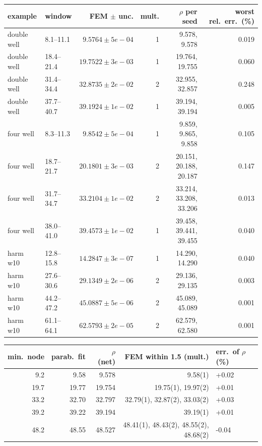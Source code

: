 \begin{tabular}{llrrrr}
\toprule
example & window & FEM $\pm$ unc. & mult. & $\rho$ per seed & worst rel.\ err.\ (\%) \\
\midrule
double well & 8.1--11.1 & $9.5764\pm5e-04$ & 1 & 9.578, 9.578 & 0.019 \\
double well & 18.4--21.4 & $19.7522\pm3e-03$ & 1 & 19.764, 19.755 & 0.060 \\
double well & 31.4--34.4 & $32.8735\pm2e-02$ & 2 & 32.955, 32.857 & 0.248 \\
double well & 37.7--40.7 & $39.1924\pm1e-02$ & 1 & 39.194, 39.194 & 0.005 \\
four well & 8.3--11.3 & $9.8542\pm5e-04$ & 1 & 9.859, 9.865, 9.858 & 0.105 \\
four well & 18.7--21.7 & $20.1801\pm3e-03$ & 2 & 20.151, 20.188, 20.187 & 0.147 \\
four well & 31.7--34.7 & $33.2104\pm1e-02$ & 2 & 33.214, 33.208, 33.206 & 0.013 \\
four well & 38.0--41.0 & $39.4573\pm1e-02$ & 1 & 39.458, 39.441, 39.455 & 0.040 \\
harm w10 & 12.8--15.8 & $14.2847\pm3e-07$ & 1 & 14.290, 14.290 & 0.040 \\
harm w10 & 27.6--30.6 & $29.1349\pm2e-06$ & 2 & 29.136, 29.135 & 0.003 \\
harm w10 & 44.2--47.2 & $45.0887\pm5e-06$ & 2 & 45.089, 45.089 & 0.001 \\
harm w10 & 61.1--64.1 & $62.5793\pm2e-05$ & 2 & 62.579, 62.580 & 0.001 \\
\bottomrule
\end{tabular}

\begin{tabular}{rrrrl}
\toprule
min.\ node & parab.\ fit & $\rho$ (net) & FEM within 1.5 (mult.) & err.\ of $\rho$ (\%) \\
\midrule
9.2 & 9.58 & 9.578 & 9.58(1) & +0.02 \\
19.7 & 19.77 & 19.754 & 19.75(1), 19.97(2) & +0.01 \\
33.2 & 32.70 & 32.797 & 32.79(1), 32.87(2), 33.03(2) & +0.03 \\
39.2 & 39.22 & 39.194 & 39.19(1) & +0.01 \\
48.2 & 48.55 & 48.527 & 48.41(1), 48.43(2), 48.55(2), 48.68(2) & -0.04 \\
\bottomrule
\end{tabular}


